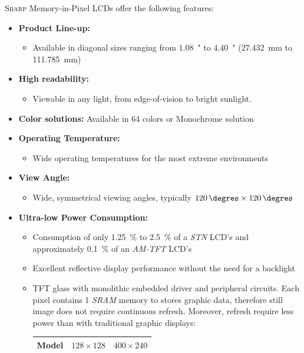 \documentclass[report.tex]{subfiles}
\begin{document}
\pagebreak
\begin{flushleft}
\textsc{Sharp} Memory-in-Pixel LCDs offer the following features:
\end{flushleft}
\begin{itemize}
\item \textbf{Product Line-up:}
\begin{itemize}
\item Available in diagonal sizes ranging from \SI{1.08}{"} to \SI{4.40}{"} (\SI{27,432}{\milli\meter} to \SI{111.785}{\milli\meter})
\end{itemize}
\item \textbf{High readability:}
\begin{itemize}
\item Viewable in any light, from edge-of-vision to bright sunlight.
\end{itemize}
\item \textbf{Color solutions:}
Available in 64 colors or Monochrome solution
\item \textbf{Operating Temperature:}
\begin{itemize}
\item Wide operating temperatures for the most extreme environments
\end{itemize}
\item \textbf{View Angle:}
\begin{itemize}
\item Wide, symmetrical viewing angles, typically $\SI{120}{\degres}\times \SI{120}{\degres}$
\end{itemize}
\item \textbf{Ultra-low Power Consumption:}
\begin{itemize}
\item Consumption of only \SI{1.25}{\percent} to \SI{2.5}{\percent} of a \textit{STN} LCD’s and approximately \SI{0.1}{\percent} of an \textit{AM-TFT} LCD’s
\item Excellent reflective display performance without the need for a backlight
\item TFT glass with monolithic embedded driver and peripheral circuits. Each pixel contains \SI{1}{\bit} \textit{SRAM} memory to stores graphic data, therefore still image does not require continuous refresh. Moreover, refresh require less power than with traditional graphic displays:
\begin{table}[H]
\centering
\begin{tabular}{|l|c|c|}\hline
\textbf{Model} & $128 \times 128$ & $400 \times 240$\\\hline

\end{tabular}
\end{table}
\end{itemize}
\end{itemize}
\end{document}

